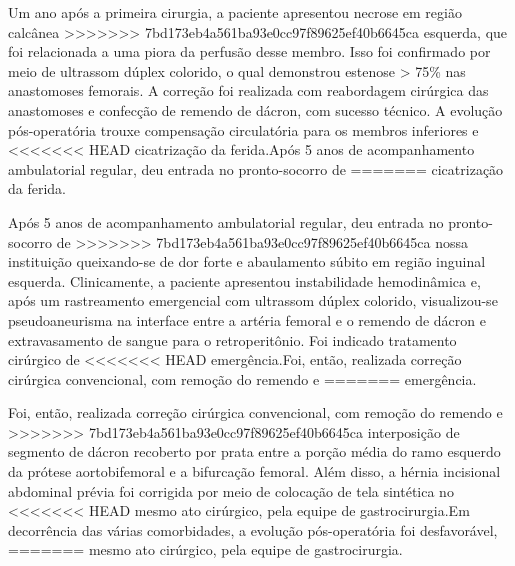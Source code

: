 \documentclass[numberinsection,times,10pt,spreadimages]{memoir}
\begin{document}
Um ano após a primeira cirurgia, a paciente apresentou necrose em região
calcânea
>>>>>>> 7bd173eb4a561ba93e0cc97f89625ef40b6645ca
esquerda, que foi relacionada a uma piora da perfusão desse membro. Isso foi
confirmado por meio de ultrassom dúplex colorido, o qual demonstrou estenose >
75\% nas anastomoses femorais. A correção foi realizada com reabordagem
cirúrgica das
anastomoses e confecção de remendo de dácron, com sucesso técnico. A evolução
pós-operatória trouxe compensação circulatória para os membros inferiores e
<<<<<<< HEAD
cicatrização da ferida.Após 5 anos de acompanhamento ambulatorial regular, deu
entrada no pronto-socorro de
=======
cicatrização da ferida.

Após 5 anos de acompanhamento ambulatorial regular, deu entrada no
pronto-socorro de
>>>>>>> 7bd173eb4a561ba93e0cc97f89625ef40b6645ca
nossa instituição queixando-se de dor forte e abaulamento súbito em região
inguinal
esquerda. Clinicamente, a paciente apresentou instabilidade hemodinâmica e, após
um
rastreamento emergencial com ultrassom dúplex colorido, visualizou-se
pseudoaneurisma na interface entre a artéria femoral e o remendo de dácron e
extravasamento de sangue para o retroperitônio. Foi indicado tratamento
cirúrgico de
<<<<<<< HEAD
emergência.Foi, então, realizada correção cirúrgica convencional, com remoção do
remendo e
=======
emergência.

Foi, então, realizada correção cirúrgica convencional, com remoção do remendo e
>>>>>>> 7bd173eb4a561ba93e0cc97f89625ef40b6645ca
interposição de segmento de dácron recoberto por prata entre a porção média do
ramo
esquerdo da prótese aortobifemoral e a bifurcação femoral. Além disso, a hérnia
incisional abdominal prévia foi corrigida por meio de colocação de tela
sintética no
<<<<<<< HEAD
mesmo ato cirúrgico, pela equipe de gastrocirurgia.Em decorrência das várias
comorbidades, a evolução pós-operatória foi desfavorável,
=======
mesmo ato cirúrgico, pela equipe de gastrocirurgia.
\end{document}
